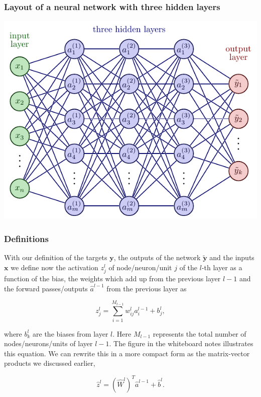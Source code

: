 \documentclass{beamer}
\begin{document}
\begin{frame}
\frametitle{Layout of a neural network with three hidden layers}

\vspace{6mm}

\centerline{\includegraphics[width=1.0\linewidth]{figures/nn1.pdf}}

\vspace{6mm}
\end{frame}

\begin{frame}
\frametitle{Definitions}

With our definition of the targets $\bm{y}$, the outputs of the
network $\bm{\tilde{y}}$ and the inputs $\bm{x}$ we
define now the activation $z_j^l$ of node/neuron/unit $j$ of the
$l$-th layer as a function of the bias, the weights which add up from
the previous layer $l-1$ and the forward passes/outputs
$\hat{a}^{l-1}$ from the previous layer as

\[
z_j^l = \sum_{i=1}^{M_{l-1}}w_{ij}^la_i^{l-1}+b_j^l,
\]

where $b_k^l$ are the biases from layer $l$.  Here $M_{l-1}$
represents the total number of nodes/neurons/units of layer $l-1$. The
figure in the whiteboard notes illustrates this equation.  We can rewrite this in a more
compact form as the matrix-vector products we discussed earlier,

\[
\hat{z}^l = \left(\hat{W}^l\right)^T\hat{a}^{l-1}+\hat{b}^l.
\]
\end{frame}
\end{document}
